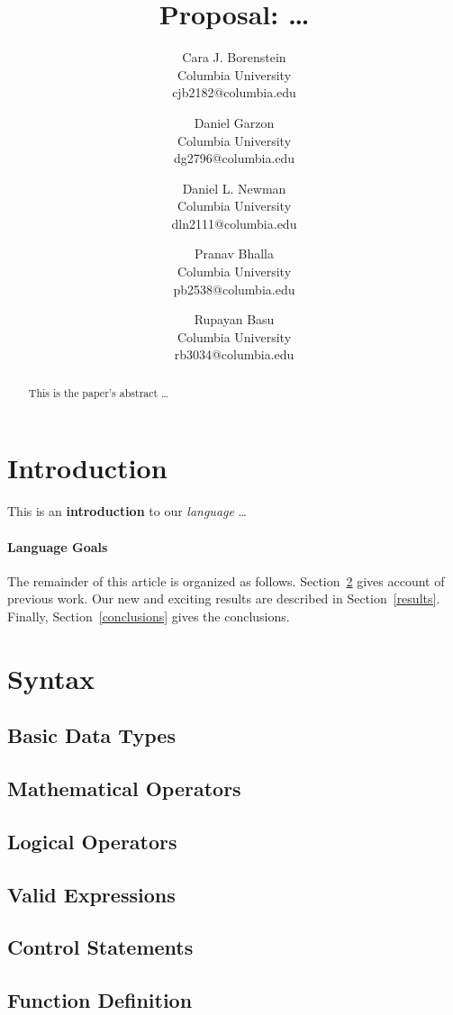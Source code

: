 \documentclass[11pt]{article}
\title{\textbf{\huge Proposal: \ldots}}
\author{
  Cara J. Borenstein\\
  Columbia University\\
  cjb2182@columbia.edu
  \and
  Daniel Garzon\\
  Columbia University\\
  dg2796@columbia.edu
  \and
  Daniel L. Newman\\
  Columbia University\\
  dln2111@columbia.edu
  \and
  Pranav Bhalla\\
  Columbia University\\
  pb2538@columbia.edu
  \and
  Rupayan Basu\\
  Columbia University\\
  rb3034@columbia.edu
}
\date{}
\begin{document}
\changepage{1cm}{}{}{}{}{-1cm}{}{}{}

\maketitle


\begin{abstract}
This is the paper's abstract \ldots
\end{abstract}

\section{Introduction}
This is an \textbf{introduction} to our \emph{language} \ldots

\paragraph{Language Goals}
The remainder of this article is organized as follows.
Section~\ref{previous work} gives account of previous work.
Our new and exciting results are described in Section~\ref{results}.
Finally, Section~\ref{conclusions} gives the conclusions.

\section{Syntax}\label{previous work}

\subsection{Basic Data Types}
\subsection{Mathematical Operators}
\subsection{Logical Operators}
\subsection{Valid Expressions}
\subsection{Control Statements}
\subsection{Function Definition}
\end{document}

